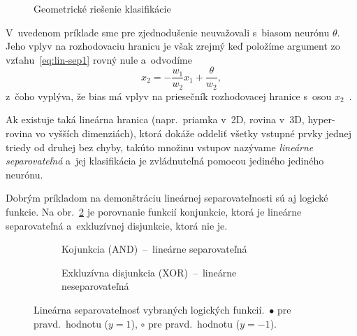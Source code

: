   \begin{figure}[b!]
    \centering
    
    \caption[Geometrické riešenie klasifikácie]{Geometrické riešenie klasifikácie}\label{fig:classification-geometry}
  \end{figure}

  V~uvedenom príklade sme pre zjednodušenie neuvažovali s~biasom neurónu $\theta$. Jeho vplyv na rozhodovaciu hranicu je však zrejmý keď položíme argument zo vzťahu~\ref{eq:lin-sep1} rovný nule a~odvodíme
  \begin{equation}
    x_2 = -\frac{w_1}{w_2} x_1 + \frac{\theta}{w_2},
  \end{equation}
  z~čoho vyplýva, že bias má vplyv na priesečník rozhodovacej hranice s~osou $x_2$~\cite{mehligMachineLearningNeural2021}.

  Ak existuje taká lineárna hranica (napr.\ priamka v~2D, rovina v~3D, hyper-rovina vo vyšších dimenziách), ktorá dokáže oddeliť všetky vstupné prvky jednej triedy od druhej bez chyby, takúto množinu vstupov nazývame \emph{lineárne separovateľná} a~jej klasifikácia je zvládnuteľná pomocou jediného jediného neurónu.

  Dobrým príkladom na demonštráciu lineárnej separovateľnosti sú aj logické funkcie. Na obr.~\ref{fig:boolean} je porovnanie funkcií konjunkcie, ktorá je lineárne separovateľná a~exkluzívnej disjunkcie, ktorá nie je.

  \begin{figure}[t!]
    \centering
    \begin{subfigure}[b]{0.45\textwidth}\centering
      
      \caption{Kojunkcia (AND)~--~lineárne separovateľná}
    \end{subfigure}
    \hfill
    \begin{subfigure}[b]{0.45\textwidth}\centering
      
      \caption{Exkluzívna disjunkcia (XOR)~--~lineárne neseparovateľná}
    \end{subfigure}
    \caption[Lineárna separovateľnosť vybraných logických funkcií]{Lineárna separovateľnosť vybraných logických funkcií.\ $\bullet{}$ pre pravd.\ hodnotu  ($y = 1$), $\circ{}$ pre pravd.\ hodnotu  ($y = -1$).}\label{fig:boolean}
  \end{figure}

